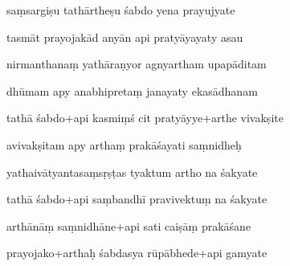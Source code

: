 \documentclass[article,12pt,a4paper]{memoir}%
\newcounter{parCount}
\begin{document}
	  
	  \pstart {} saṃsargiṣu tathārtheṣu śabdo yena prayujyate 
	{}
	\pend%
      

	  
	  \pstart \leavevmode%
	tasmāt prayojakād anyān api pratyāyayaty asau 
	{}
	\pend%
      

	  
	  \pstart {} nirmanthanaṃ yathāraṇyor agnyartham upapāditam 
	{}
	\pend%
      

	  
	  \pstart \leavevmode%
	dhūmam apy anabhipretaṃ janayaty ekasādhanam 
	{}
	\pend%
      

	  
	  \pstart {} tathā śabdo+api kasmiṃś cit pratyāyye+arthe vivakṣite 
	{}
	\pend%
      

	  
	  \pstart \leavevmode%
	avivakṣitam apy arthaṃ prakāśayati saṃnidheḥ 
	{}
	\pend%
      

	  
	  \pstart {} yathaivātyantasaṃsṛṣṭas tyaktum artho na śakyate 
	{}
	\pend%
      

	  
	  \pstart \leavevmode%
	tathā śabdo+api saṃbandhī pravivektuṃ na śakyate 
	{}
	\pend%
      

	  
	  \pstart {} arthānāṃ saṃnidhāne+api sati caiṣāṃ prakāśane 
	{}
	\pend%
      

	  
	  \pstart \leavevmode%
	prayojako+arthaḥ śabdasya rūpābhede+api gamyate 
	{}
	\pend%
      
\end{document}
